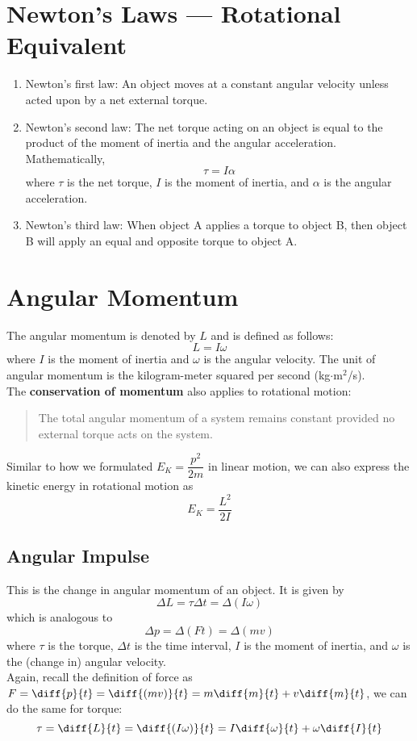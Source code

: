 \documentclass[a4paper,12pt]{article}
\let\oldsection\section
\renewcommand\section{\clearpage\oldsection}
\newcommand{\lb}{\\[8pt]}
\begin{document}
\section{Newton's Laws --- Rotational Equivalent}

\begin{enumerate}
  \item Newton's first law: An object moves at a constant angular velocity unless acted upon by a net external torque.
  \item Newton's second law: The net torque acting on an object is equal to the product of the moment of inertia and the angular acceleration. Mathematically, $$\tau = I\alpha$$where $\tau$ is the net torque, $I$ is the moment of inertia, and $\alpha$ is the angular acceleration.
  \item Newton's third law: When object A applies a torque to object B, then object B will apply an equal and opposite torque to object A.
\end{enumerate}

\section{Angular Momentum}

The angular momentum is denoted by $L$ and is defined as follows:
$$L = I\omega$$where $I$ is the moment of inertia and $\omega$ is the angular velocity. The unit of angular momentum is the kilogram-meter squared per second (kg$\cdot$m$^2$/s).\lb
The \textbf{conservation of momentum} also applies to rotational motion:
\begin{quote}
  The total angular momentum of a system remains constant provided no
  external torque acts on the system.
\end{quote}
Similar to how we formulated $E_K = \dfrac{p^2}{2m}$ in linear motion, we can also express the kinetic energy in rotational motion as  $$E_K = \dfrac{L^2}{2I}$$

\subsection{Angular Impulse}

This is the change in angular momentum of an object. It is given by $$\Delta L = \tau \Delta t = \Delta(I\omega)$$which is analogous to$$\Delta p = \Delta(Ft) = \Delta(mv)$$where $\tau$ is the torque, $\Delta t$ is the time interval, $I$ is the moment of inertia, and $\omega$ is the (change in) angular velocity.\lb
Again, recall the definition of force as $F = \diff{p}{t} = \diff{(mv)}{t} = m\diff{m}{t} + v\diff{m}{t}$, we can do the same for torque: $$\tau = \diff{L}{t} = \diff{(I\omega)}{t} = I\diff{\omega}{t} + \omega\diff{I}{t}$$
\end{document}
